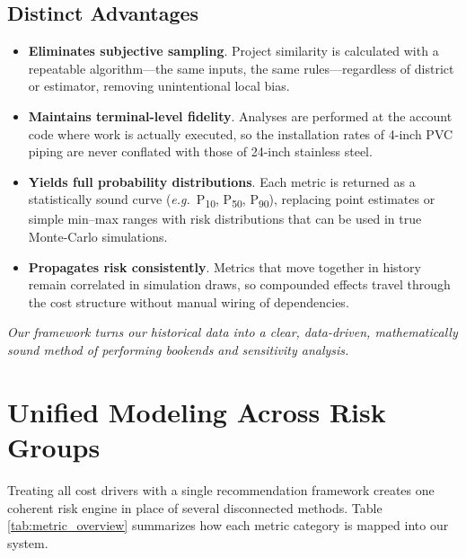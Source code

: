 \documentclass[12pt, a4paper]{article} %
\begin{document}
\subsection*{Distinct Advantages}

\begin{itemize}
    \item \textbf{Eliminates subjective sampling}.  
          Project similarity is calculated with a repeatable algorithm—the same inputs, the same rules—regardless of district or estimator, removing unintentional local bias.
    \item \textbf{Maintains terminal-level fidelity}.  
          Analyses are performed at the account code where work is actually executed, so the installation rates of 4-inch PVC piping are never conflated with those of 24-inch stainless steel.
    \item \textbf{Yields full probability distributions}.  
          Each metric is returned as a statistically sound curve (\emph{e.g.}\ P\textsubscript{10}, P\textsubscript{50}, P\textsubscript{90}), replacing point estimates or simple min–max ranges with risk distributions that can be used in true Monte-Carlo simulations.
    \item \textbf{Propagates risk consistently}.  
          Metrics that move together in history remain correlated in simulation draws, so compounded effects travel through the cost structure without manual wiring of dependencies.
\end{itemize}

\bigskip

\noindent\emph{Our framework turns our historical data into a clear, data-driven, mathematically sound method of performing bookends and sensitivity analysis.}

\section{Unified Modeling Across Risk Groups}

Treating all cost drivers with a single recommendation framework creates one coherent risk engine in place of several disconnected methods. Table \ref{tab:metric_overview} summarizes how each metric category is mapped into our system.
\end{document}
